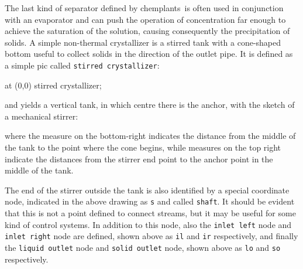 \documentclass[12pt]{article}						%
\newcommand*{\chpn}[1]{\texttt{#1}}				%
\newcommand*{\chpp}[1]{\texttt{#1}}				%
\newcommand*{\chemplants}{chemplants}
\begin{document}
The last kind of separator defined by \chemplants\ is often used in conjunction
with an evaporator and can push the operation of concentration far enough to
achieve the saturation of the solution, causing consequently the precipitation
of solids. A simple non-thermal crystallizer is a stirred tank with a
cone-shaped bottom useful to collect solids in the direction of the outlet
pipe. It is defined as a simple pic called \chpp{stirred crystallizer}:
\begin{chpcode}
	\pic at (0,0) {stirred crystallizer};
\end{chpcode}
and yields a vertical tank, in which centre there is the anchor, with the sketch
of a mechanical stirrer:
\begin{center}
\end{center}
where the measure on the bottom-right indicates the distance from the middle of
the tank to the point where the cone begins, while measures on the top right
indicate the distances from the stirrer end point to the anchor point in the
middle of the tank.

The end of the stirrer outside the tank is also identified by a special
coordinate node, indicated in the above drawing as \chpn{s} and called
\chpn{shaft}. It should be evident that this is not a point defined to connect
streams, but it may be useful for some kind of control systems. In addition
to this node, also the \chpn{inlet left} node and \chpn{inlet right} node are
defined, shown above as \chpn{il} and \chpn{ir} respectively, and finally the
\chpn{liquid outlet} node and \chpn{solid outlet} node, shown above as \chpn{lo}
and \chpn{so} respectively.
\end{document}
